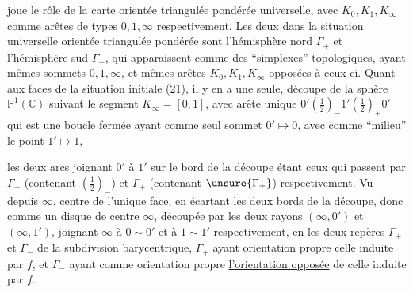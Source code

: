 joue le rôle de la carte orientée triangulée pondérée universelle, avec $K_0,K_1,K_\infty$ comme arêtes de types $0,1,\infty$ respectivement. Les deux   dans la situation universelle orientée triangulée pondérée sont l'hémisphère nord $\Gamma_+$ et l'hémisphère sud $\Gamma_-$, qui apparaissent comme des ``simplexes'' topologiques, ayant mêmes sommets $0,1,\infty$, et mêmes arêtes $K_0,K_1,K_\infty$ opposées à ceux-ci. Quant aux faces de la situation initiale (21), il y en a une seule, découpe de la sphère $\mathbb P^1(\mathbb C)$ suivant le segment $K_\infty=[0,1]$, avec   arête unique $0'(\frac12)_-1'(\frac12)_+0'$  qui est une boucle fermée ayant comme seul sommet $0'\mapsto0$, avec comme ``milieu'' le point $1'\mapsto1$,


les deux arcs joignant $0'$ à $1'$ sur le bord de la découpe étant ceux qui passent par $\Gamma_-$ (contenant $(\frac12)_-$) et $\Gamma_+$ (contenant $\unsure{\Gamma_+}$) respectivement. Vu depuis $\infty$, centre de l'unique face, en écartant les deux bords de la découpe,  donc comme un disque de centre $\infty$, découpée par les deux rayons  $(\infty,0')$ et $(\infty,1')$, joignant $\infty$ à $0\sim0'$ et à $1\sim1'$ respectivement, en les deux repères $\Gamma_+$ et $\Gamma_-$ de la subdivision barycentrique, $\Gamma_+$ ayant   orientation propre celle induite par $f$,  et $\Gamma_-$ ayant comme orientation propre \uline{l'orientation opposée} de celle induite par $f$.  

